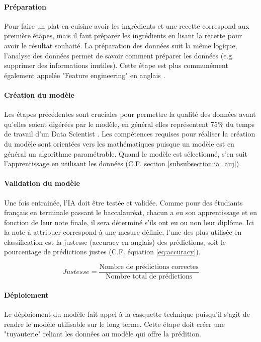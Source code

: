 \documentclass[10pt, french, a4paper]{report}
\begin{document}
\paragraph{Préparation}
Pour faire un plat en cuisine avoir les ingrédients et une recette correspond aux première étapes, mais il faut préparer les ingrédients en lisant la recette pour avoir le résultat souhaité. La préparation des données suit la même logique, l'analyse des données permet de savoir comment préparer les données (e.g. supprimer des informations inutiles). Cette étape est plus communément également appelée "Feature engineering" en anglais \citep{mayo_machine_2018}.

\paragraph{Création du modèle}
Les étapes précédentes sont cruciales pour permettre la qualité des données avant qu'elles soient digérées par le modèle, en général elles représentent 75\% du temps de travail d'un Data Scientist \citep{figure_eight_state_2019}. Les compétences requises pour réaliser la création du modèle sont orientées vers les mathématiques puisque un modèle est en général un algorithme paramétrable. Quand le modèle est sélectionné, s'en suit l'apprentissage en utilisant les données (C.F. section \ref{subsubsection:ia_auj}).

\paragraph{Validation du modèle}
Une fois entrainée, l'IA doit être testée et validée. Comme pour des étudiants français en terminale passant le baccalauréat, chacun a eu son apprentissage et en fonction de leur note finale, il sera déterminé s'ils ont eu ou non leur diplôme. Ici la note à attribuer correspond à une mesure définie, l'une des plus utilisée en classification est la justesse (accuracy en anglais) des prédictions, soit le pourcentage de prédictions justes (C.F. équation \ref{eq:accuracy}).

\begin{equation}\label{eq:accuracy}
    Justesse = \frac{\text{Nombre de prédictions correctes}}{\text{Nombre total de prédictions}}
\end{equation}

\paragraph{Déploiement}
Le déploiement du modèle fait appel à la casquette technique puisqu'il s'agit de rendre le modèle utilisable sur le long terme. Cette étape doit créer une "tuyauterie" reliant les données au modèle qui offre la prédition. 
\end{document}
